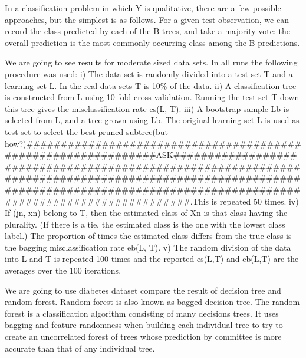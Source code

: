 \documentclass[
]{article}
\begin{document}
In a classification problem in which Y is qualitative, there are a few
possible approaches, but the simplest is as follows. For a given test
observation, we can record the class predicted by each of the B trees,
and take a majority vote: the overall prediction is the most commonly
occurring class among the B predictions.

We are going to see results for moderate sized data sets. In all runs
the following procedure was used: i) The data set is randomly divided
into a test set T and a learning set L. In the real data sets T is 10\%
of the data. ii) A classification tree is constructed from L using
10-fold cross-validation. Running the test set T down this tree gives
the misclassification rate es(L, T). iii) A bootstrap sample Lb is
selected from L, and a tree grown using Lb. The original learning set L
is used as test set to select the best pruned subtree(but
how?)\#\#\#\#\#\#\#\#\#\#\#\#\#\#\#\#\#\#\#\#\#\#\#\#\#\#\#\#\#\#\#\#\#\#\#\#\#\#\#\#\#\#\#\#\#\#\#\#\#\#\#\#\#\#\#\#\#\#\#\#\#\#ASK\#\#\#\#\#\#\#\#\#\#\#\#\#\#\#\#\#\#\#\#\#\#\#\#\#\#\#\#\#\#\#\#\#\#\#\#\#\#\#\#\#\#\#\#\#\#\#\#\#\#\#\#\#\#\#\#\#\#\#\#\#\#\#\#\#\#\#\#\#\#\#\#\#\#\#\#\#\#\#\#\#\#\#\#\#\#\#\#\#\#\#\#\#\#\#\#\#\#\#\#\#\#\#\#\#\#\#\#\#\#\#\#\#\#\#\#\#\#\#\#\#\#\#\#\#\#\#\#\#\#\#\#\#\#\#\#\#\#\#\#\#\#\#\#\#\#\#\#\#\#\#\#\#\#\#\#\#\#\#\#\#\#\#\#\#\#\#\#\#\#\#\#\#\#.This
is repeated 50 times. iv) If (jn, xn) belong to T, then the estimated
class of Xn is that class having the plurality. (If there is a tie, the
estimated class is the one with the lowest class label.) The proportion
of times the estimated class differs from the true class is the bagging
misclassification rate eb(L, T). v) The random division of the data into
L and T is repeated 100 times and the reported es(L,T) and eb(L,T) are
the averages over the 100 iterations.

We are going to use diabetes dataset compare the result of decision tree
and random forest. Random forest is also known as bagged decision tree.
The random forest is a classification algorithm consisting of many
decisions trees. It uses bagging and feature randomness when building
each individual tree to try to create an uncorrelated forest of trees
whose prediction by committee is more accurate than that of any
individual tree.
\end{document}
